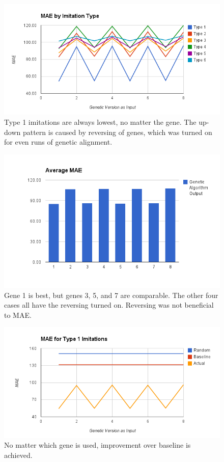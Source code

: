 \begin{figure}[center]
	\centering
	\includegraphics[width=16cm]{images/total_error_all_approaches.png}
	\caption{Type 1 imitations are always lowest, no matter the gene. The up-down pattern is caused by reversing of genes, which was turned on for even runs of genetic alignment. }
	\label{fig:totalErrorAll}
\end{figure}

\begin{figure}[center]
	\centering
	\includegraphics[width=16cm]{images/average_MAE.png}
	\caption{Gene 1 is best, but genes 3, 5, and 7 are comparable. The other four cases all have the reversing turned on. Reversing was not beneficial to MAE.}
	\label{fig:overall}
\end{figure}

\begin{figure}[center]
	\centering
	\includegraphics[width=16cm]{images/error_type_1_imitations.png}
	\caption{No matter which gene is used, improvement over baseline is achieved.}
	\label{fig:c1}
\end{figure}

